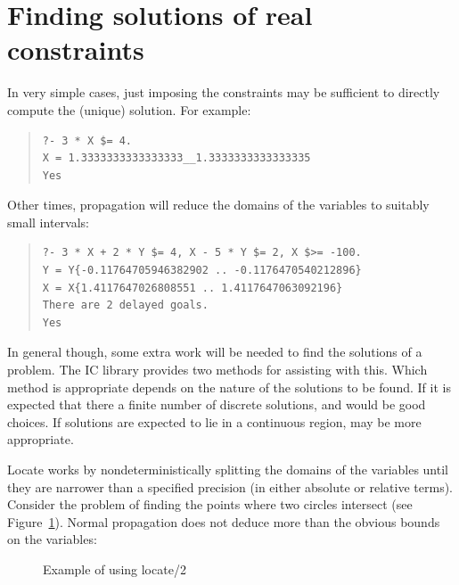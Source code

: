 \section{Finding solutions of real constraints}

In very simple cases, just imposing the constraints may be sufficient to
directly compute the (unique) solution.  For example:

\begin{quote}\begin{verbatim}
?- 3 * X $= 4.
X = 1.3333333333333333__1.3333333333333335
Yes
\end{verbatim}\end{quote}

Other times, propagation will reduce the domains of the variables to
suitably small intervals:

\begin{quote}\begin{verbatim}
?- 3 * X + 2 * Y $= 4, X - 5 * Y $= 2, X $>= -100.
Y = Y{-0.11764705946382902 .. -0.1176470540212896}
X = X{1.4117647026808551 .. 1.4117647063092196}
There are 2 delayed goals.
Yes
\end{verbatim}\end{quote}

In general though, some extra work will be needed to find the solutions of a
problem.  The IC library provides two methods for assisting with this.
Which method is appropriate depends on the nature of the solutions to be
found.  If it is expected that there a finite number of discrete solutions,
 and
 would be good choices.  If
solutions are expected to lie in a continuous region,
 may be more appropriate.

Locate works by nondeterministically splitting the domains of the variables
until they are narrower than a specified precision (in either absolute or
relative terms).  Consider the problem of finding the points where two
circles intersect (see Figure~\ref{locatefig}).  Normal propagation does not
deduce more than the obvious bounds on the variables:

\begin{figure}
\begin{center}
\end{center}
\caption{Example of using locate/2}
\label{locatefig}
\end{figure}

